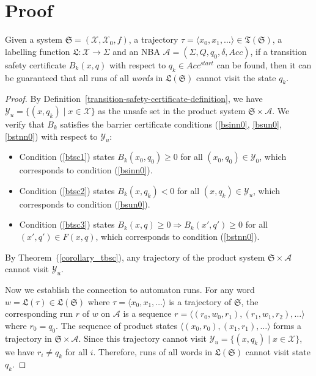 \section{Proof}
\label{appendix-proof}
\begin{lemma}
  \label{appendix-transition-safety-lemma}
  Given a system $\mathfrak{S} = (\mathcal{X}, \mathcal{X}_0, f)$, a trajectory $\tau=\langle x_0, x_1, \dots \rangle \in \mathfrak{T}(\mathfrak{S})$, a labelling function $\mathfrak{L}:\mathcal{X} \rightarrow \Sigma$ and an NBA $\mathcal{A}=(\Sigma, Q, q_0, \delta, Acc)$, if a transition safety certificate $B_{k}(x, q)$ with respect to $q_k \in Acc^{start}$ can be found, then it can be guaranteed that all runs of all \emph{words} in $\mathfrak{L}(\mathfrak{S})$ cannot visit the state $q_k$.
\end{lemma}

\begin{proof}
  By Definition~\ref{transition-safety-certificate-definition}, we have $\mathcal{Y}_u = \{(x, q_k) \mid x \in \mathcal{X}\}$ as the unsafe set in the product system $\mathfrak{S} \times \mathcal{A}$. We verify that $B_k$ satisfies the barrier certificate conditions (\ref{bsinn0}, \ref{bsun0}, \ref{bstnn0}) with respect to $\mathcal{Y}_u$:
  \begin{itemize}
    \item Condition (\ref{btsc1}) states $B_k(x_0, q_0) \geq 0$ for all $(x_0, q_0) \in \mathcal{Y}_0$, which corresponds to condition (\ref{bsinn0}).
    \item Condition (\ref{btsc2}) states $B_k(x, q_k) < 0$ for all $(x, q_k) \in \mathcal{Y}_u$, which corresponds to condition (\ref{bsun0}).
    \item Condition (\ref{btsc3}) states $B_k(x, q) \geq 0 \Rightarrow B_k(x', q') \geq 0$ for all $(x', q') \in F(x, q)$, which corresponds to condition (\ref{bstnn0}).
  \end{itemize}

  By Theorem~(\ref{corollary_tbsc}), any trajectory of the product system $\mathfrak{S} \times \mathcal{A}$ cannot visit $\mathcal{Y}_u$.

  Now we establish the connection to automaton runs. For any word $w = \mathfrak{L}(\tau) \in \mathfrak{L}(\mathfrak{S})$ where $\tau = \langle x_0, x_1, \dots \rangle$ is a trajectory of $\mathfrak{S}$, the corresponding run $r$ of $w$ on $\mathcal{A}$ is a sequence $r = \langle (r_0, w_0, r_1), (r_1, w_1, r_2), \ldots \rangle$ where $r_0 = q_0$. The sequence of product states $\langle (x_0, r_0), (x_1, r_1), \ldots \rangle$ forms a trajectory in $\mathfrak{S} \times \mathcal{A}$. Since this trajectory cannot visit $\mathcal{Y}_u = \{(x, q_k) \mid x \in \mathcal{X}\}$, we have $r_i \neq q_k$ for all $i$. Therefore, runs of all words in $\mathfrak{L}(\mathfrak{S})$ cannot visit state $q_k$.
\end{proof}

